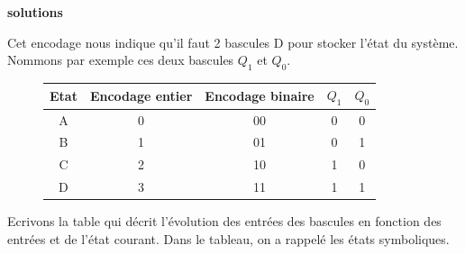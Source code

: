 \documentclass[a4paper,11pt]{article}
\begin{document}
\newpage
{\bf solutions}

Cet encodage nous indique qu'il faut 2 bascules D pour stocker l'état du système. Nommons par exemple ces deux bascules $Q_1$ et $Q_0$.

\begin{figure}
\begin{center}

      \begin{tabular}{|c||c|c|cc|}
          \hline
          Etat  & Encodage entier & Encodage binaire & $Q_1$ & $Q_0$ \\ \hline \hline
          A     & 0 & 00 & 0 & 0 \\ \hline
          B     & 1 & 01 & 0 & 1 \\ \hline
          C     & 2 & 10 & 1 & 0 \\ \hline
          D     & 3 & 11 & 1 & 1 \\ \hline
      \end{tabular}
\end{center}
\end{figure}

Ecrivons la table qui décrit l'évolution des entrées des bascules en fonction des entrées et de l'état courant. Dans le tableau, on a rappelé les états symboliques.
\end{document}
